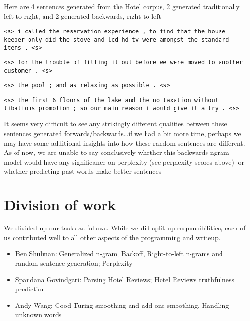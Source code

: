 \documentclass{article}
\begin{document}
\begin{adjustwidth}{0.25in}{0.5in}
Here are 4 sentences generated from the Hotel corpus, 2 generated traditionally left-to-right, and 2 generated backwards, right-to-left.\par
{\small
\texttt{<s> i called the reservation experience ; to find that the house keeper only did the stove and lcd hd tv were amongst the standard items . <s>}\par
\texttt{<s> for the trouble of filling it out before we were moved to another customer . <s>}\par\smallskip
\texttt{<s> the pool ; and as relaxing as possible . <s>}\par
\texttt{<s> the first 6 floors of the lake and the no taxation without libations promotion ; so our main reason i would give it a try . <s>}
}\par
It seems very difficult to see any strikingly different qualities between these sentences generated forwards/backwards\ldots if we had a bit more time, perhaps we may have some additional insights into how these random sentences are different. As of now, we are unable to say conclusively whether this backwards ngram model would have any significance on perplexity (see perplexity scores above), or whether predicting past words make better sentences.
\end{adjustwidth}

\section{Division of work}
We divided up our tasks as follows. While we did split up responsibilities, each of us contributed well to all other aspects of the programming and writeup.

\begin{itemize}[noitemsep]
\item Ben Shulman: Generalized n-gram, Backoff, Right-to-left n-grams and random sentence generation; Perplexity
\item Spandana Govindgari: Parsing Hotel Reviews; Hotel Reviews truthfulness prediction
\item Andy Wang: Good-Turing smoothing and add-one smoothing, Handling unknown words
\end{itemize}
\end{document}
